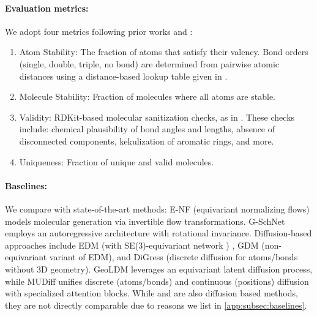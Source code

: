 \paragraph{Evaluation metrics:}
\label{par:mol_gen_eval_metrics}
We adopt four metrics following prior works \cite{hua2024mudiff} and \cite{hoogeboom2022equivariant}: 
\begin{enumerate}[noitemsep,topsep=0pt]
    \item Atom Stability: The fraction of atoms that satisfy their valency. Bond orders (single, double, triple, no bond) are determined from pairwise atomic distances using a distance-based lookup table given in \cite{hoogeboom2022equivariant}.
    \item Molecule Stability: Fraction of molecules where all atoms are stable.
    \item Validity: RDKit-based \cite{landrum2006rdkit} molecular sanitization checks, as in \cite{hoogeboom2022equivariant}. These checks include: chemical plausibility of bond angles and lengths, absence of disconnected components, kekulization of aromatic rings, and more.
    \item Uniqueness: Fraction of unique and valid molecules.
\end{enumerate}

\paragraph{Baselines:}
We compare with state-of-the-art methods: E-NF (equivariant normalizing flows) \cite{pmlr-v119-kohler20a} models molecular generation via invertible flow transformations. G-SchNet \cite{NIPS2019_8974} employs an autoregressive architecture with rotational invariance. Diffusion-based approaches include EDM \cite{hoogeboom2022equivariant} (with SE(3)-equivariant network \cite{fuchs2020se}) , GDM \cite{hoogeboom2022equivariant} (non-equivariant variant of EDM), and DiGress \cite{vignac2023digress} (discrete diffusion for atoms/bonds without 3D geometry). GeoLDM \cite{xu2023geometric} leverages an equivariant latent diffusion process, while MUDiff \cite{hua2024mudiff} unifies discrete (atoms/bonds) and continuous (positions) diffusion with specialized attention blocks. While \cite{peng2023moldiff} and \cite{vignac2023midi} are also diffusion based methods, they are not directly comparable due to reasons we list in \ref{app:subsec:baselines}.

